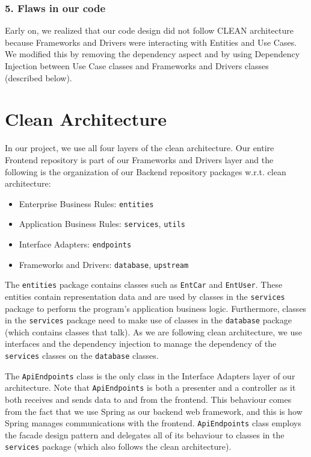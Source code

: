 \documentclass[fontsize=14pt]{article}
\def\code#1{\texttt{#1}}
\begin{document}
\subsubsection*{5. Flaws in our code}

Early on, we realized that our code design did not follow CLEAN architecture because Frameworks and Drivers were interacting with Entities and Use Cases. We modified this by removing the dependency aspect and by using Dependency Injection between Use Case classes and Frameworks and Drivers classes (described below).

\section*{Clean Architecture}

In our project, we use all four layers of the clean architecture. Our entire Frontend repository is part of our Frameworks and Drivers layer and the following is the organization of our Backend repository packages w.r.t. clean architecture:
\begin{itemize}
    \item Enterprise Business Rules: \code{entities}
    \item Application Business Rules: \code{services}, \code{utils}
    \item Interface Adapters: \code{endpoints}
    \item Frameworks and Drivers: \code{database}, \code{upstream}
\end{itemize}

The \code{entities} package contains classes such as \code{EntCar} and \code{EntUser}. These entities contain representation data and are used by classes in the \code{services} package to perform the program's application business logic. Furthermore, classes in the \code{services} package need to make use of classes in the \code{database} package (which contains classes that talk). As we are following clean architecture, we use interfaces and the dependency injection to manage the dependency of the \code{services} classes on the \code{database} classes.


The \code{ApiEndpoints} class is the only class in the Interface Adapters layer of our architecture. Note that \code{ApiEndpoints} is both a presenter and a controller as it both receives and sends data to and from the frontend. This behaviour comes from the fact that we use Spring as our backend web framework, and this is how Spring manages communications with the frontend. \code{ApiEndpoints} class employs the facade design pattern and delegates all of its behaviour to classes in the \code{services} package (which also follows the clean architecture).
\end{document}
